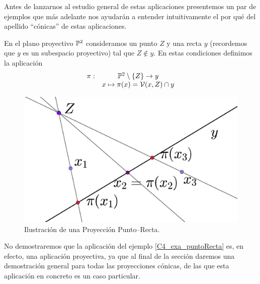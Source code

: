 Antes de lanzarnos al estudio general de estas aplicaciones presentemos un par de ejemplos que más adelante nos ayudarán a entender intuitivamente el por qué del apellido ``cónicas'' de estas aplicaciones.
\begin{exa}
	\label{C4_exa_puntoRecta}
	En el plano proyectivo $\mathbb{P}^2$ consideramos un punto $Z$ y una recta $y$ (recordemos que $y$ es un subespacio proyectivo) tal que $Z\not\in y$. En estas condiciones definimos la aplicación
	\[\begin{array}{cc}
		\pi:&\mathbb{P}^2\setminus\{Z\}\to y\\
		&x\mapsto \pi(x)=\mathcal{V}(x,Z)\cap y
	\end{array}\]
	\begin{figure}[h]
		\centering
		\includegraphics[scale=.15]{Graficos/rectaPunto.eps}
		\caption{Ilustración de una Proyección Punto--Recta.}
		\label{C4_puntoRecta}
	\end{figure}
	
\end{exa}

No demostraremos que la aplicación del ejemplo \ref{C4_exa_puntoRecta} es, en efecto, una aplicación proyectiva, ya que al final de la sección daremos una demostración general para todas las proyecciones cónicas, de las que esta aplicación en concreto es un caso particular.

